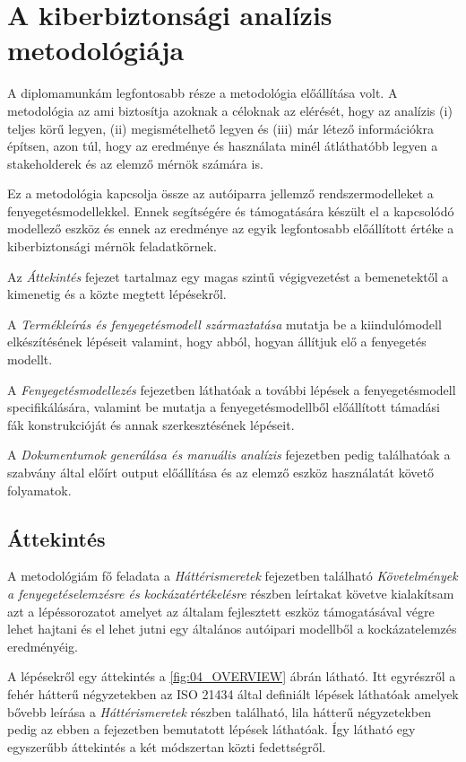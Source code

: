 \chapter{A kiberbiztonsági analízis metodológiája}

A diplomamunkám legfontosabb része a metodológia előállítása volt. A metodológia az ami biztosítja azoknak a céloknak az elérését, hogy az analízis (i) teljes körű legyen, (ii) megismételhető legyen és (iii) már létező információkra építsen, azon túl, hogy az eredménye és használata minél átláthatóbb legyen a stakeholderek és az elemző mérnök számára is.

Ez a metodológia kapcsolja össze az autóiparra jellemző rendszermodelleket a fenyegetésmodellekkel. Ennek segítségére és támogatására készült el a kapcsolódó modellező eszköz és ennek az eredménye az egyik legfontosabb előállított értéke a kiberbiztonsági mérnök feladatkörnek.

Az \textit{Áttekintés} fejezet tartalmaz egy magas szintű végigvezetést a bemenetektől a kimenetig és a közte megtett lépésekről.

A \textit{Termékleírás és fenyegetésmodell származtatása} mutatja be a kiindulómodell elkészítésének lépéseit valamint, hogy abból, hogyan állítjuk elő a fenyegetés modellt.

A \textit{Fenyegetésmodellezés} fejezetben láthatóak a további lépések a fenyegetésmodell specifikálására, valamint be mutatja a fenyegetésmodellből előállított támadási fák konstrukcióját és annak szerkesztésének lépéseit.

A \textit{Dokumentumok generálása és manuális analízis} fejezetben pedig találhatóak a szabvány által előírt output előállítása és az elemző eszköz használatát követő folyamatok.

\section{Áttekintés}

A metodológiám fő feladata a \textit{Háttérismeretek} fejezetben található \textit{Követelmények a fenyegetéselemzésre és kockázatértékelésre} részben leírtakat követve kialakítsam azt a lépéssorozatot amelyet az általam fejlesztett eszköz támogatásával végre lehet hajtani és el lehet jutni egy általános autóipari modellből a kockázatelemzés eredményéig.

A lépésekről egy áttekintés a \ref{fig:04_OVERVIEW} ábrán látható. Itt egyrészről a fehér hátterű négyzetekben az ISO 21434 által definiált lépések láthatóak amelyek bővebb leírása a \textit{Háttérismeretek} részben található, lila hátterű négyzetekben pedig az ebben a fejezetben bemutatott lépések láthatóak. Így látható egy egyszerűbb áttekintés a két módszertan közti fedettségről.

